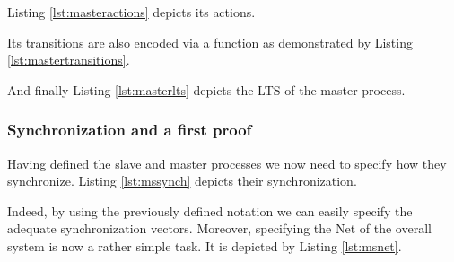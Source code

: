 	\noindent Listing \ref{lst:masteractions} depicts its \textsf{actions}.

		

	\noindent Its transitions are also encoded via a function as demonstrated by 
	Listing \ref{lst:mastertransitions}.
	
				
	
	\noindent And finally Listing \ref{lst:masterlts} depicts the \textsf{LTS} of the master process.
	
	
						
	
	
	\noindent 	
	
	
\subsubsection{Synchronization and a first proof}	
\label{subsub:synch}	
	
	
	Having defined the slave and master processes we now need to specify how they synchronize.
	Listing \ref{lst:mssynch}	depicts their synchronization.	
	
						
	
	\noindent Indeed, by using the previously defined notation we can easily specify
	the adequate synchronization vectors. Moreover, specifying the \textsf{Net} of the
	overall system is now a rather simple task.	
	It is depicted by Listing \ref{lst:msnet}.

				

